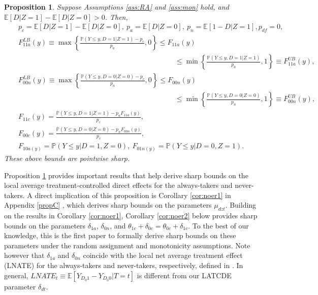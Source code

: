 \documentclass[12pt]{article}
\theoremstyle{plain}
\newtheorem{proposition}{Proposition}%
\theoremstyle{definition}
\theoremstyle{remark}
\begin{document}
\begin{proposition}\label{prop:noer}
Suppose Assumptions \ref{ass:RA} and \ref{ass:mon} hold, and $\mathbb{E}[D  \vert  Z=1] - \mathbb{E}[D  \vert  Z=0]> 0$. Then,
\begin{eqnarray*}
    && p_c=\mathbb{E}[D  \vert  Z=1] - \mathbb{E}[D  \vert  Z=0],\ p_a=\mathbb E[D\vert Z=0],\ p_n=\mathbb E[1-D\vert Z=1], p_{df}=0,\\
    && F_{11a}^{LB}(y)\equiv \max\left\{\frac{\mathbb P(Y\leq y, D=1 \vert Z=1)- p_c}{p_a},0\right\} \leq F_{11a}(y)\\
    && \qquad \qquad \qquad \qquad \qquad \qquad \qquad \qquad \qquad \qquad \qquad \leq \min\left\{\frac{\mathbb P(Y\leq y, D=1 \vert Z=1)}{p_a},1\right\} \equiv F_{11a}^{UB}(y),\\
    &&F_{00n}^{LB}(y) \equiv \max\left\{\frac{\mathbb P(Y\leq y, D=0 \vert Z=0)- p_c}{p_n},0\right\} \leq F_{00n}(y)\\
    && \qquad \qquad \qquad \qquad \qquad \qquad \qquad \qquad \qquad \qquad \qquad \leq \min\left\{\frac{\mathbb P(Y\leq y, D=0 \vert Z=0)}{p_n},1\right\} \equiv F_{00n}^{UB}(y),\\
    && F_{11c}(y) = \frac{\mathbb P(Y\leq y, D=1 \vert Z=1)- p_a F_{11a}(y)}{p_c},\\
    && F_{00c}(y) = \frac{\mathbb P(Y\leq y, D=0 \vert Z=0)- p_n F_{00n}(y)}{p_c},\\
    && F_{10a(y)}=\mathbb P(Y \leq y \vert D=1, Z=0),\ F_{01n(y)}=\mathbb P(Y \leq y \vert D=0, Z=1).
\end{eqnarray*}
These above bounds are pointwise sharp.   
\end{proposition}
Proposition \ref{prop:noer} provides important results that help derive sharp bounds on the local average treatment-controlled direct effects for the always-takers and never-takers. A direct implication of this proposition is Corollary \ref{cor:noer1} in Appendix \ref{propC}
, which derives sharp bounds on the parameters $\mu_{dzt}$. Building on the results in Corollary \ref{cor:noer1}, Corollary \ref{cor:noer2} below provides sharp bounds on the parameters $\delta_{1a}$, $\delta_{0n}$, and $\theta_{1c}+\delta_{0c}=\theta_{0c}+\delta_{1c}$. To the best of our knowledge, this is the first paper to formally derive sharp bounds on these parameters under the random assignment and monotonicity assumptions. Note however that $\delta_{1a}$ and $\delta_{0n}$ coincide with the local net average treatment effect (LNATE) for the always-takers and never-takers, respectively, defined in \cite{flores2013partial}. In general, $LNATE_t\equiv \mathbb E[Y_{D_0 1}-Y_{D_0 0}\vert T=t]$ is different from our LATCDE parameter $\delta_{dt}$.  
\end{document}

